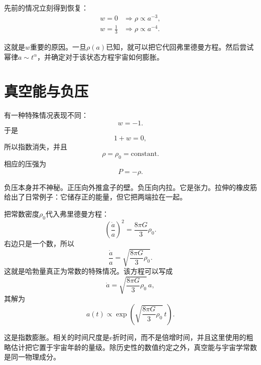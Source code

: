 先前的情况立刻得到恢复：
\begin{align}
w=0 &\Longrightarrow \rho \propto a^{-3},\\
w=\frac{1}{3} &\Longrightarrow \rho \propto a^{-4}.
\end{align}

这就是\(w\)重要的原因。一旦\(\rho(a)\)已知，就可以把它代回弗里德曼方程。然后尝试幂律\(a\sim t^\alpha\)，并确定对于该状态方程宇宙如何膨胀。

\section{真空能与负压}

有一种特殊情况表现不同：
\begin{equation}
w=-1.
\end{equation}
于是
\begin{equation}
1+w=0,
\end{equation}
所以指数消失，并且
\begin{equation}
\rho=\rho_0=\text{constant}.
\end{equation}
相应的压强为
\begin{equation}
P=-\rho .
\end{equation}

负压本身并不神秘。正压向外推盒子的壁。负压向内拉。它是张力。拉伸的橡皮筋给出了日常例子：它储存正的能量，但它把两端拉在一起。

把常数密度\(\rho_0\)代入弗里德曼方程：
\begin{equation}
\left(\frac{\dot a}{a}\right)^2=\frac{8\pi G}{3}\rho_0.
\end{equation}
右边只是一个数，所以
\begin{equation}
\frac{\dot a}{a}=\sqrt{\frac{8\pi G}{3}\rho_0}.
\end{equation}
这就是哈勃量真正为常数的特殊情况。该方程可以写成
\begin{equation}
\dot a=\sqrt{\frac{8\pi G}{3}\rho_0}\,a,
\end{equation}
其解为
\begin{equation}
a(t)\propto \exp\!\left(\sqrt{\frac{8\pi G}{3}\rho_0}\,t\right).
\end{equation}

这是指数膨胀。相关的时间尺度是\(e\)折时间，而不是倍增时间，并且这里使用的粗略估计把它置于宇宙年龄的量级。除历史性的数值约定之外，真空能与宇宙学常数是同一物理成分。

\begin{classroomqa}
\end{classroomqa}

